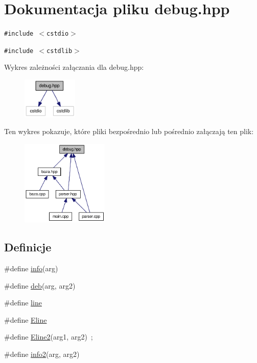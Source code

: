 \hypertarget{a00008}{
\section{Dokumentacja pliku debug.hpp}
\label{d4/dee/a00008}
}
{\tt \#include $<$cstdio$>$}\par
{\tt \#include $<$cstdlib$>$}\par


Wykres zależności załączania dla debug.hpp:\nopagebreak
\begin{figure}[H]
\begin{center}
\leavevmode
\includegraphics[width=74pt]{d1/dc6/a00037}
\end{center}
\end{figure}


Ten wykres pokazuje, które pliki bezpośrednio lub pośrednio załączają ten plik:\nopagebreak
\begin{figure}[H]
\begin{center}
\leavevmode
\includegraphics[width=118pt]{d8/d41/a00038}
\end{center}
\end{figure}
\subsection*{Definicje}
\begin{CompactItemize}
\item 
\#define \hyperlink{a00008_590af51ecfed28223c4e6ce02994241a}{info}(arg)
\item 
\#define \hyperlink{a00008_21ad5938437ed6d1865dd14c8d1871bc}{deb}(arg, arg2)
\item 
\#define \hyperlink{a00008_5bdec07ba0f5f220bcb40d5258725d95}{line}
\item 
\#define \hyperlink{a00008_9944134306515208e366f3f347ef3653}{Eline}
\item 
\#define \hyperlink{a00008_68b6fd999967bd748d50fc2014bc5903}{Eline2}(arg1, arg2)~;
\item 
\#define \hyperlink{a00008_51633d6d15647d74f756bcf969fc70ae}{info2}(arg, arg2)
\end{CompactItemize}


